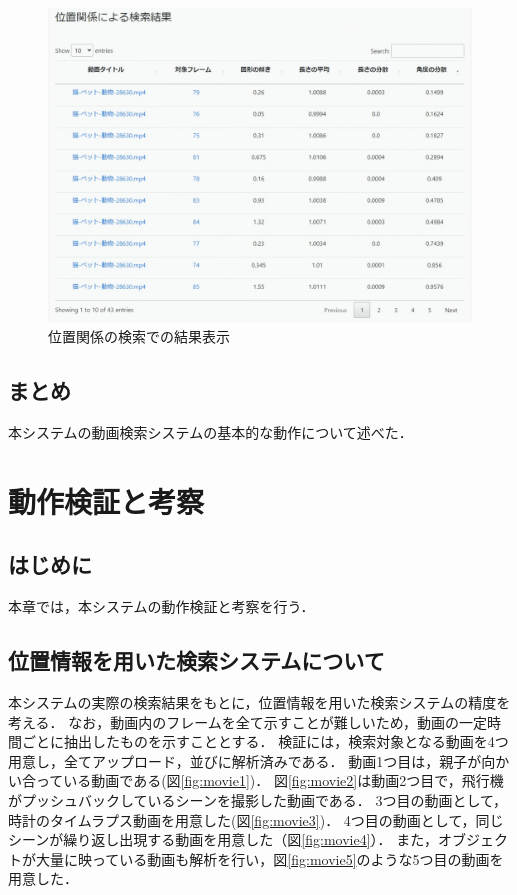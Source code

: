 \documentclass[a4j,12pt,dvipdfmx]{jreport}
\begin{document}
\begin{figure}[b]
  \centering
  \includegraphics[width=13cm]{image/result0_2.png}
  \caption{位置関係の検索での結果表示}
  \label{fig:result0_2}
\end{figure}


\section{まとめ}\label{chap:3-6}
本システムの動画検索システムの基本的な動作について述べた．

\clearpage

\chapter{動作検証と考察}
\label{sec:consideration}

\section{はじめに}\label{chap4-1}
本章では，本システムの動作検証と考察を行う．

\section{位置情報を用いた検索システムについて}\label{chap4-2}
本システムの実際の検索結果をもとに，位置情報を用いた検索システムの精度を考える．
なお，動画内のフレームを全て示すことが難しいため，動画の一定時間ごとに抽出したものを示すこととする．
検証には，検索対象となる動画を4つ用意し，全てアップロード，並びに解析済みである．
動画1つ目は，親子が向かい合っている動画である(図\ref{fig:movie1})．
図\ref{fig:movie2}は動画2つ目で，飛行機がプッシュバックしているシーンを撮影した動画である．
3つ目の動画として，時計のタイムラプス動画を用意した(図\ref{fig:movie3})．
4つ目の動画として，同じシーンが繰り返し出現する動画を用意した（図\ref{fig:movie4}）．
また，オブジェクトが大量に映っている動画も解析を行い，図\ref{fig:movie5}のような5つ目の動画を用意した．
\end{document}
